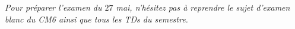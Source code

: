 \vspace{1cm}

\begin{center}
\begin{mdframed}[backgroundcolor=ThemeLight, linecolor=Theme,
  linewidth=1pt, innertopmargin=8pt, innerbottommargin=8pt]
\textit{Pour préparer l'examen du $27$ mai, n'hésitez pas à reprendre le sujet d'examen blanc du CM6 ainsi que tous les TDs du semestre.}
\end{mdframed}
\end{center}


